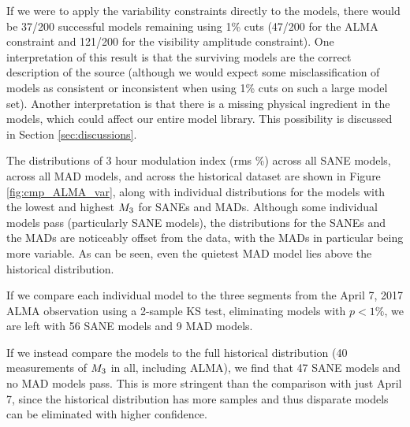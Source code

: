 If we were to apply the variability constraints directly to the models, there would be 37/200 successful models remaining using 1\% cuts (47/200 for the ALMA constraint and 121/200 for the visibility amplitude constraint).  One interpretation of this result is that the surviving models are the correct description of the source (although we would expect some misclassification of models as consistent or inconsistent when using 1\% cuts on such a large model set).  Another interpretation is that there is a missing physical ingredient in the models, which could affect our entire model library. This possibility is discussed in Section \ref{sec:discussions}.


The distributions of 3 hour modulation index (rms \%) across all SANE models, across all MAD models, and across the historical dataset are shown in Figure \ref{fig:cmp_ALMA_var}, along with individual distributions for the models with the lowest and highest $M_{3}$ for SANEs and MADs. Although some individual models  pass (particularly SANE models), the distributions for the SANEs and the MADs are noticeably offset from the data, with the MADs in particular being more variable. As can be seen, even the quietest MAD model lies above the historical distribution.

If we compare each individual model to the three segments from the April 7, 2017 ALMA observation using a 2-sample KS test, eliminating models with $p < 1\%$, we are left with 56 SANE models and 9 MAD models.

If we instead compare the models to the full historical distribution (40 measurements of $M_{3}$ in all, including ALMA), we find that 47 SANE models and no MAD models pass. This is more stringent than the comparison with just April 7, since the historical distribution has more samples and thus disparate models can be eliminated with higher confidence.

